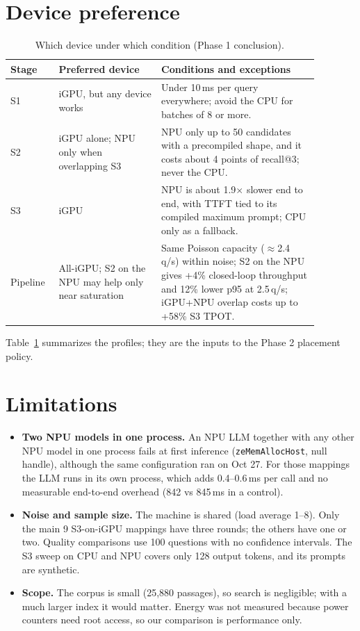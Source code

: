 \documentclass[10pt]{article}
\begin{document}
\section{Device preference}
\begin{table}[!htb]\centering\small
\caption{Which device under which condition (Phase 1 conclusion).}\label{tab:prefer}
\begin{tabular}{p{0.12\linewidth}p{0.3\linewidth}p{0.46\linewidth}}\toprule
Stage & Preferred device & Conditions and exceptions\\\midrule
S1 & iGPU, but any device works & Under 10\,ms per query everywhere; avoid the CPU for batches of 8 or more.\\
S2 & iGPU alone; NPU only when overlapping S3 & NPU only up to 50 candidates with a precompiled shape, and it costs about 4 points of recall@3; never the CPU.\\
S3 & iGPU & NPU is about 1.9$\times$ slower end to end, with TTFT tied to its compiled maximum prompt; CPU only as a fallback.\\
Pipeline & All-iGPU; S2 on the NPU may help only near saturation & Same Poisson capacity ($\approx$2.4\,q/s) within noise; S2 on the NPU gives +4\% closed-loop throughput and 12\% lower p95 at 2.5\,q/s; iGPU+NPU overlap costs up to +58\% S3 TPOT.\\\bottomrule
\end{tabular}
\end{table}

Table~\ref{tab:prefer} summarizes the profiles; they are the inputs to the Phase 2 placement policy.

\section{Limitations}
\begin{itemize}\setlength\itemsep{0pt}
\item \textbf{Two NPU models in one process.} An NPU LLM together with any other NPU model in one process fails at first inference (\texttt{zeMemAllocHost}, null handle), although the same configuration ran on Oct 27. For those mappings the LLM runs in its own process, which adds 0.4--0.6\,ms per call and no measurable end-to-end overhead (842 vs 845\,ms in a control).
\item \textbf{Noise and sample size.} The machine is shared (load average 1--8). Only the main 9 S3-on-iGPU mappings have three rounds; the others have one or two. Quality comparisons use 100 questions with no confidence intervals. The S3 sweep on CPU and NPU covers only 128 output tokens, and its prompts are synthetic.
\item \textbf{Scope.} The corpus is small (25,880 passages), so search is negligible; with a much larger index it would matter. Energy was not measured because power counters need root access, so our comparison is performance only.
\end{itemize}
\end{document}
